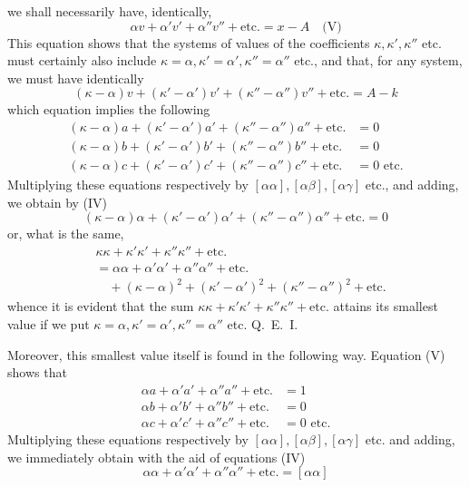 we shall necessarily have, identically,
\[
\alpha v+\alpha'v'+\alpha''v''+\text{etc.}=x-A\quad\text{(V)}
\]
This equation shows that the systems of values of the coefficients \(\kappa,\kappa',\kappa''\) etc. must certainly also include \(\kappa=\alpha,\kappa'=\alpha',\kappa''=\alpha''\) etc., and that, for any system, we must have identically
\[
(\kappa-\alpha)v+(\kappa'-\alpha')v'+(\kappa''-\alpha'')v''+\text{etc.}=A-k
\]
which equation implies the following
\[
\begin{aligned}
(\kappa-\alpha)a+(\kappa'-\alpha')a'+(\kappa''-\alpha'')a''+\text{etc.}&=0\\
(\kappa-\alpha)b+(\kappa'-\alpha')b'+(\kappa''-\alpha'')b''+\text{etc.}&=0\\
(\kappa-\alpha)c+(\kappa'-\alpha')c'+(\kappa''-\alpha'')c''+\text{etc.}&=0\text{ etc.}
\end{aligned}
\]
Multiplying these equations respectively by \([\alpha\alpha],[\alpha\beta],[\alpha\gamma]\) etc., and adding, we obtain by (IV)
\[
(\kappa-\alpha)\alpha+(\kappa'-\alpha')\alpha'+(\kappa''-\alpha'')\alpha''+\text{etc.}=0
\]
or, what is the same,
\[
\begin{aligned}
&\kappa\kappa+\kappa'\kappa'+\kappa''\kappa''+\text{etc.}\\
&=\alpha\alpha+\alpha'\alpha'+\alpha''\alpha''+\text{etc.}{}\\
&\quad+(\kappa-\alpha)^2+(\kappa'-\alpha')^2+(\kappa''-\alpha'')^2+\text{etc.}
\end{aligned}
\]
whence it is evident that the sum \(\kappa\kappa+\kappa'\kappa'+\kappa''\kappa''+\text{etc.}\) attains its smallest value if we put \(\kappa=\alpha,\kappa'=\alpha',\kappa''=\alpha''\) etc. Q.~E.~I.

Moreover, this smallest value itself is found in the following way. Equation (V) shows that
\[
\begin{aligned}
\alpha a+\alpha'a'+\alpha''a''+\text{etc.}&=1\\
\alpha b+\alpha'b'+\alpha''b''+\text{etc.}&=0\\
\alpha c+\alpha'c'+\alpha''c''+\text{etc.}&=0\text{ etc.}
\end{aligned}
\]
Multiplying these equations respectively by \([\alpha\alpha],[\alpha\beta],[\alpha\gamma]\) etc. and adding, we immediately obtain with the aid of equations (IV)
\[
\alpha\alpha+\alpha'\alpha'+\alpha''\alpha''+\text{etc.}=[\alpha\alpha]
\]

\clearpage

